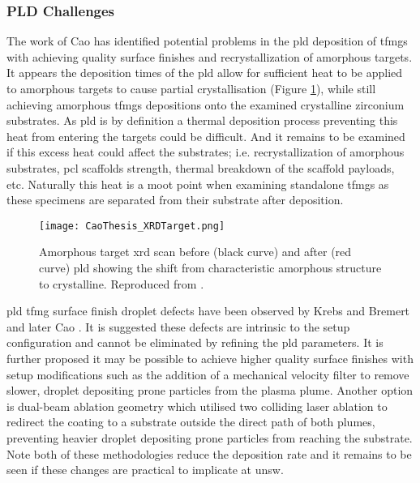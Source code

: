 \documentclass[a4paper,12pt,oneside]{report}%
\begin{document}
\subsubsection{PLD Challenges}
The work of Cao \cite{Cao2013} has identified potential problems in the \gls{pld} deposition of \glspl{tfmg} with achieving quality surface finishes and recrystallization of amorphous targets. It appears the deposition times of the \gls{pld} allow for sufficient heat to be applied to amorphous targets to cause partial crystallisation (Figure \ref{fig:ReCryTarget}), while still achieving amorphous \glspl{tfmg} depositions onto the examined crystalline zirconium substrates. As \gls{pld} is by definition a thermal deposition process preventing this heat from entering the targets could be difficult. And it remains to be examined if this excess heat could affect the substrates; i.e. recrystallization of amorphous substrates, \gls{pcl} scaffolds strength, thermal breakdown of the scaffold payloads, etc. Naturally this heat is a moot point when examining standalone \glspl{tfmg} as these specimens are separated from their substrate after deposition. 

\begin{figure}[htbp]
	\centering
	\texttt{[image: CaoThesis\_XRDTarget.png]}
	\caption[Amorphous target \acrshort{xrd} scan before (black curve) and after (red curve) \acrshort{pld} showing the shift from characteristic amorphous structure to crystalline.]{Amorphous target \acrshort{xrd} scan before (black curve) and after (red curve) \acrshort{pld} showing the shift from characteristic amorphous structure to crystalline. Reproduced from \cite{Cao2013}.}
	\label{fig:ReCryTarget}
\end{figure}

\Gls{pld} \gls{tfmg} surface finish droplet defects have been observed by Krebs and Bremert \cite{Krebs1993} and later Cao \cite{Cao2013}. It is suggested these defects are intrinsic to the setup configuration and cannot be eliminated by refining the \gls{pld} parameters. It is further proposed it may be possible to achieve higher quality surface finishes with setup modifications such as the addition of a mechanical velocity filter to remove slower, droplet depositing prone particles from the plasma plume. Another option is dual-beam ablation geometry which utilised two colliding laser ablation to redirect the coating to a substrate outside the direct path of both plumes, preventing heavier droplet depositing prone particles from reaching the substrate. Note both of these methodologies reduce the deposition rate and it remains to be seen if these changes are practical to implicate at \acrshort{unsw}.
\end{document}
